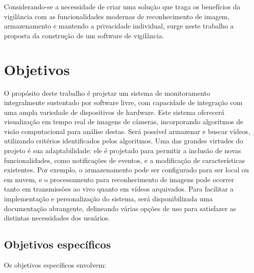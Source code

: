 \documentclass[12pt, %
openright, 
oneside, %
a4paper,    %
brazil]{facom-ufu-abntex2}
\begin{document}
Considerando-se a necessidade de criar uma solução que traga os benefícios da
vigilância com as funcionalidades modernas de reconhecimento de imagem,
armazenamento e mantendo a privacidade individual, surge neste trabalho a
proposta da construção de um software de vigilância.

\section{Objetivos}

O propósito deste trabalho é projetar um sistema de monitoramento integralmente
sustentado por software livre, com capacidade de integração com uma ampla
variedade de dispositivos de hardware. Este sistema oferecerá visualização em
tempo real de imagens de câmeras, incorporando algoritmos de visão
computacional para análise destas. Será possível armazenar e buscar vídeos,
utilizando critérios identificados pelos algoritmos. Uma das grandes virtudes
do projeto é sua adaptabilidade: ele é projetado para permitir a inclusão de
novas funcionalidades, como notificações de eventos, e a modificação de
características existentes. Por exemplo, o armazenamento pode ser configurado
para ser local ou em nuvem, e o processamento para reconhecimento de imagens
pode ocorrer tanto em transmissões ao vivo quanto em vídeos arquivados. Para
facilitar a implementação e personalização do sistema, será disponibilizada uma
documentação abrangente, delineando várias opções de uso para satisfazer as
distintas necessidades dos usuários.

\subsection{Objetivos específicos}

Os objetivos específicos envolvem:
\end{document}
